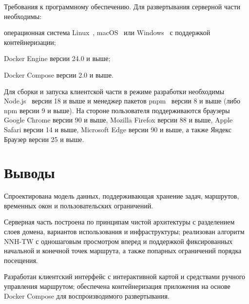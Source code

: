 Требования к программному обеспечению. Для развертывания серверной части необходимы:

\begin{compactlist}
  \item операционная система Linux~\cite{linux_kernel}, macOS~\cite{macos}
        или Windows~\cite{windows} с поддержкой контейнеризации;
  \item Docker Engine версии 24.0 и выше;
  \item Docker Compose версии 2.0 и выше.
\end{compactlist}

Для сборки и запуска клиентской части в режиме разработки необходимы
Node.js~\cite{nodejs} версии 18 и выше и менеджер пакетов
pnpm~\cite{pnpm} версии 8 и выше (либо npm версии 9 и выше). На стороне пользователя поддерживаются
браузеры Google Chrome версии 90 и выше, Mozilla Firefox версии 88
и выше, Apple Safari версии 14 и выше, Microsoft Edge версии 90 и выше,
а также Яндекс Браузер версии 25 и выше.

\section{Выводы}

Спроектирована модель данных, поддерживающая хранение задач, маршрутов,
временных окон и пользовательских ограничений.

Серверная часть построена по принципам чистой архитектуры с разделением
слоев домена, вариантов использования и инфраструктуры; реализован
алгоритм NNH-TW с одношаговым просмотром вперед и поддержкой
фиксированных начальной и конечной точек маршрута, а также попарных
ограничений порядка посещения.

Разработан клиентский интерфейс с интерактивной картой и средствами
ручного управления маршрутом; обеспечена контейнеризация приложения
на основе Docker Compose для воспроизводимого развертывания.
